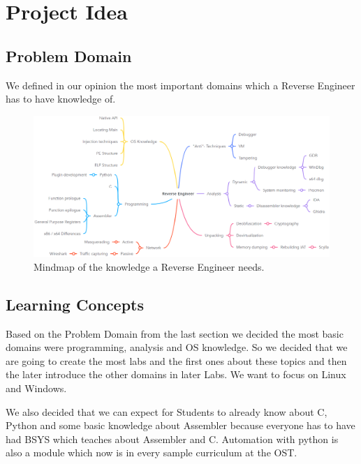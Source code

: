 \chapter{Project Idea}
\section{Problem Domain}
We defined in our opinion the most important domains which a Reverse Engineer has to have knowledge of.
\begin{figure}[H]
    \includegraphics[width=\linewidth, center]{resources/ReverseEngineeringDomain.png}
    \caption{Mindmap of the knowledge a Reverse Engineer needs.}
    \label{fig:mindmap}
\end{figure}

\section{Learning Concepts}
Based on the Problem Domain from the last section we decided the most basic domains were programming, analysis and OS knowledge. So we decided that we are going to create the most labs and the first ones about these topics and then the later introduce the other domains in later Labs. We want to focus on Linux and Windows.

\noindent We also decided that we can expect for Students to already know about C, Python and some basic knowledge about Assembler because everyone has to have had BSYS which teaches about Assembler and C. Automation with python is also a module which now is in every sample curriculum at the OST.

